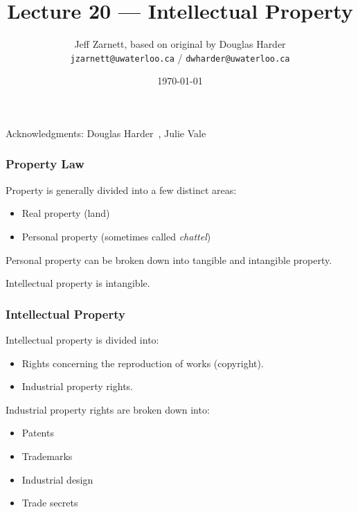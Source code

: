 

\title{Lecture 20 --- Intellectual Property }

\author{Jeff Zarnett, based on original by Douglas Harder \\ \small \texttt{jzarnett@uwaterloo.ca} / \texttt{dwharder@uwaterloo.ca}}
\date{\today}




\begin{frame}
  \titlepage

\begin{center}
  \small{Acknowledgments: Douglas Harder~\cite{dwh}, Julie Vale~\cite{jv}}
  \end{center}
\end{frame}



\begin{frame}
\frametitle{Property Law}

Property is generally divided into a few distinct areas:

\begin{itemize}
	\item Real property (land)
	\item Personal property (sometimes called \textit{chattel})
\end{itemize}

Personal property can be broken down into tangible and intangible property.

Intellectual property is intangible. 

\end{frame}



\begin{frame}
\frametitle{Intellectual Property}

Intellectual property is divided into:
\begin{itemize}
	\item Rights concerning the reproduction of works (copyright).
	\item Industrial property rights.
\end{itemize}

Industrial property rights are broken down into:

\begin{itemize}
	\item Patents
	\item Trademarks
	\item Industrial design
	\item Trade secrets
\end{itemize}


\end{frame}



